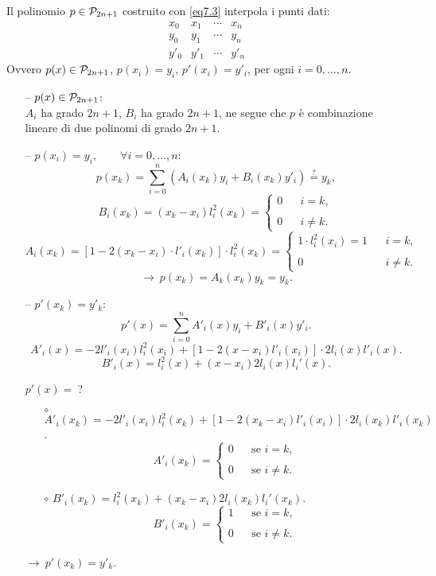 \begin{prop}
Il polinomio $p \in \mathcal{P}_{2n+1}$ costruito con \ref{eq7.3} interpola i punti
dati:
\[\begin{array}{ccccc}
x_0 & x_1 & \cdots & x_n   \\
y_0 & y_1 & \cdots & y_n  \\
y'_0 & y'_1 & \cdots & y'_n
\end{array}\]
Ovvero $p(x) \in \mathcal{P}_{2n +1}$, $p(x_i) = y_i,\, p'(x_i) = y'_i$, per ogni $i =
0, \ldots, n$.
\end{prop}
\begin{dimo}
\begin{itemize}
\item[--] $p(x) \in \mathcal{P}_{2n+1}$:\\

$A_i$ ha grado $2n+1$, $B_i$ ha grado $2n+1$, ne segue che $p$ è combinazione
lineare di due polinomi di grado $2n+1$.
\item[--]$p(x_i) = y_i,\qquad \forall i = 0, \ldots , n$:
\[p(x_k) = \sum_{i=0}^n \left(A_i(x_k)y_i + B_i(x_k)y'_i \right)
\stackrel{?}{=} y_k,\]
\[
B_i(x_k) = (x_k-x_i)l_i^2(x_k) = \left\{\begin{array}{lcr}0 & & i = k, \\ \\
0 & &i \neq k.\end{array}\right.\]
\[
A_i(x_k) = \left[1-2(x_k-x_i)\cdot l'_i(x_k)\right]\cdot l_i^2(x_k) =
\left\{\begin{array}{lcr}
1 \cdot l_i^2(x_i) = 1 & & i = k, \\
\\
0 & & i \neq k.
\end{array}\right.
\]
\[
\longrightarrow \ p(x_k) = A_k(x_k) y_k = y_k.
\]
\item[--]$p'(x_k) = y'_k$:
\[p'(x) = \sum_{i=0}^nA'_i(x)y_i + B'_i(x)y'_i.\]
\[A'_i(x) = -2 l'_i (x_i)l_i^2(x_i)+[1-2(x-x_i)l'_i(x_i)]\cdot 2l_i(x)l'_i(x).\]
\[B'_i(x) = l_i^2(x) + (x-x_i)2l_i(x)l_i'(x).\]

$p'(x) = \ $?

\begin{itemize}
\item[$\circ$]
$A'_i(x_k) = -2 l'_i(x_i)l^2_i(x_k) +
[1-2(x_k-x_i)l'_i(x_i)]\cdot 2l_i(x_k)l'_i(x_k)$.
\[
A'_i(x_k) = \left\{\begin{array}{lcr}0 & & \textrm{se } i = k, \\
\\
0 & & \textrm{se } i \neq k.
\end{array}\right.
\]
\item[$\circ$]$B'_i(x_k) = l_i^2(x_k) + (x_k-x_i)2l_i(x_k)l_i'(x_k)$.
\[
B'_i(x_k) = \left\{\begin{array}{lcr}1 & & \textrm{se } i = k, \\
\\
0 & & \textrm{se } i \neq k.
\end{array}\right.
\]
\end{itemize}
$\longrightarrow \ p'(x_k) = y'_k$.
\end{itemize}
\end{dimo}

